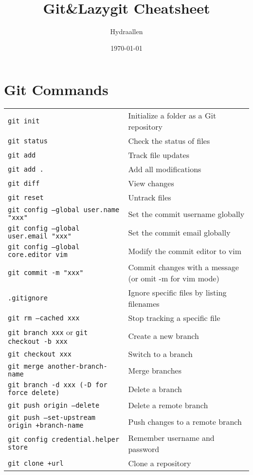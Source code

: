 \documentclass[a4paper]{article}
\title{Git\&Lazygit Cheatsheet}
\author{Hydraallen}
\date{\today}
\renewcommand{\tt}{\texttt}
\begin{document}
\maketitle
\section{Git Commands}
\begin{tabular}{p{7.5cm} p{8cm}}
    \tt{git init}                 & Initialize a folder as a Git repository \\
    \tt{git status}               & Check the status of files \\
    \tt{git add}                  & Track file updates \\
    \tt{git add .}                & Add all modifications \\
    \tt{git diff}                 & View changes \\
    \tt{git reset}                & Untrack files \\
    \tt{git config --global user.name "xxx"}    & Set the commit username globally \\
    \tt{git config --global user.email "xxx"}   & Set the commit email globally \\
    \tt{git config --global core.editor vim}    & Modify the commit editor to vim \\
    \tt{git commit -m "xxx"}                 & Commit changes with a message (or omit -m for vim mode) \\
    \tt{.gitignore}               & Ignore specific files by listing filenames \\
    \tt{git rm --cached xxx}     & Stop tracking a specific file \\
    \tt{git branch xxx} or \tt{git checkout -b xxx}         & Create a new branch \\
    \tt{git checkout xxx}        & Switch to a branch \\
    \tt{git merge another-branch-name}       & Merge branches \\
    \tt{git branch -d xxx (-D for force delete)}    & Delete a branch \\
    \tt{git push origin --delete}    & Delete a remote branch \\
    \tt{git push --set-upstream origin +branch-name}   & Push changes to a remote branch \\
    \tt{git config credential.helper store}   & Remember username and password \\
    \tt{git clone +url}    & Clone a repository \\

\end{tabular}
\end{document}
